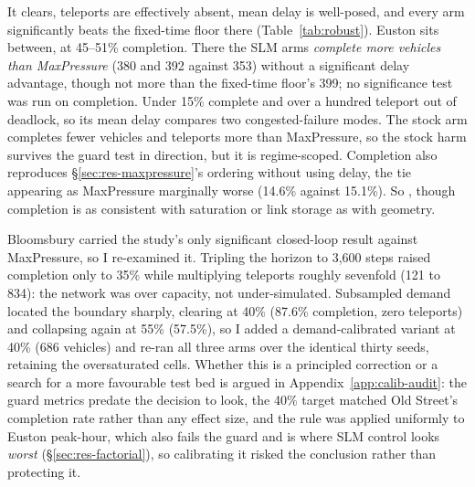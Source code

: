 It clears, teleports are effectively absent, mean
delay is well-posed, and every arm significantly beats the fixed-time floor
there (Table~\ref{tab:robust}). Euston sits between, at 45--51\%
completion. There the SLM arms \emph{complete more vehicles than
MaxPressure} (380 and 392 against 353) without a significant delay
advantage, though not more than the fixed-time floor's 399; no
significance test was run on completion.  Under 15\% complete and over a hundred
teleport out of deadlock, so its mean delay compares two congested-failure
modes. The stock arm completes fewer vehicles and teleports more than
MaxPressure, so the stock harm survives the guard test in direction, but it
is regime-scoped. Completion also reproduces \S\ref{sec:res-maxpressure}'s
ordering without using delay, the tie appearing as MaxPressure marginally
worse (14.6\% against 15.1\%). So , though completion is as consistent with
saturation or link storage as with geometry.

Bloomsbury carried the study's only significant closed-loop result against
MaxPressure, so I re-examined it. Tripling the horizon to 3{,}600 steps
raised completion only to 35\% while multiplying teleports roughly
sevenfold (121 to 834): the network was over capacity, not
under-simulated. Subsampled demand located the boundary sharply, clearing
at 40\% (87.6\% completion, zero teleports) and collapsing again at 55\%
(57.5\%), so I added a demand-calibrated variant at 40\% (686 vehicles)
and re-ran all three arms over the identical thirty seeds, retaining the
oversaturated cells. Whether this is a principled correction or a search
for a more favourable test bed is argued in
Appendix~\ref{app:calib-audit}: the guard metrics predate the decision to
look, the 40\% target matched Old Street's completion rate rather than any
effect size, and the rule was applied uniformly to Euston peak-hour, which
also fails the guard and is where SLM control looks \emph{worst}
(\S\ref{sec:res-factorial}), so calibrating it risked the conclusion rather
than protecting it.

